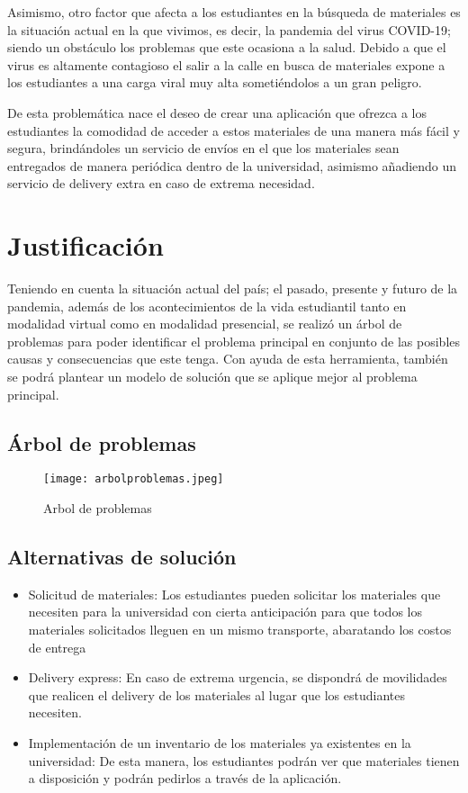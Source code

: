 \documentclass[11pt]{article}
\begin{document}
Asimismo, otro factor que afecta a los estudiantes en la búsqueda de materiales es la situación actual en la que vivimos, es decir, la pandemia del virus COVID-19; siendo un obstáculo los problemas que este ocasiona a la salud. Debido a que el virus es altamente contagioso el salir a la calle en busca de materiales expone a los estudiantes a una carga viral muy alta sometiéndolos a un gran peligro.


De esta problemática nace el deseo de crear una aplicación que ofrezca a los estudiantes la comodidad de acceder a estos materiales de una manera más fácil y segura, brindándoles un servicio de envíos en el que los materiales sean entregados de manera periódica dentro de la universidad, asimismo añadiendo un servicio de delivery extra en caso de extrema necesidad.

\section{Justificación}
Teniendo en cuenta la situación actual del país; el pasado, presente y futuro de la pandemia, además de los acontecimientos de la vida estudiantil tanto en modalidad virtual como en modalidad presencial, se realizó un árbol de problemas para poder identificar el problema principal en conjunto de las posibles causas y consecuencias que este tenga. Con ayuda de esta herramienta, también se podrá plantear un modelo de solución que se aplique mejor al problema principal.
\newpage
    \subsection{Árbol de problemas} 
    \begin{figure}[H]
        \centering
        \texttt{[image: arbolproblemas.jpeg]}
        \caption{Arbol de problemas}
        \label{arbol p}
    \end{figure}
    \subsection{Alternativas de solución} 
    \begin{itemize}
        \item Solicitud de materiales: Los estudiantes pueden solicitar los materiales que necesiten para la universidad con cierta anticipación para que todos los materiales solicitados lleguen en un mismo transporte, abaratando los costos de entrega
        \item Delivery express: En caso de extrema urgencia, se dispondrá de movilidades que realicen el delivery de los materiales al lugar que los estudiantes necesiten.
        \item Implementación de un inventario de los materiales ya existentes en la universidad: De esta manera, los estudiantes podrán ver que materiales tienen a disposición y podrán pedirlos a través de la aplicación.
    \end{itemize}
\end{document}
